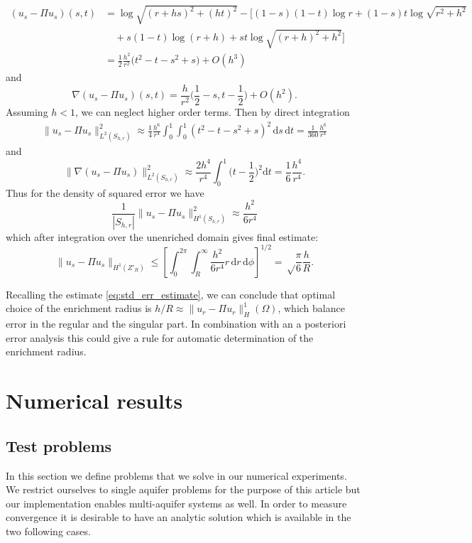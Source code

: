 \documentclass[preprint,12pt]{elsarticle}
\def\abs#1{\left|#1\right|}
\def\d{\mathrm{d}}
\def\norm#1{\| #1 \|}
\def\abs#1{| #1 |}
\begin{document}
\begin{align*}
 (u_s - \Pi u_s)(s,t)&=\log\sqrt{(r+hs)^2+(ht)^2} -\Big[(1-s)(1-t)\log r + (1-s)t\log\sqrt{r^2+h^2}\\
 &\quad+ s(1-t) \log(r+h) + st\log\sqrt{(r+h)^2+h^2} \Big]\\
 &=\frac12 \frac{h^2}{r^2}\big(t^2-t - s^2 +s\big) + O(h^3)
\end{align*}
and 
\begin{equation}
 \nabla(u_s - \Pi u_s)(s,t) = \frac{h}{r^2} \Big( \frac12-s, t-\frac12 \Big) + O(h^2).
\end{equation}
Assuming $h<1$, we can neglect higher order terms. Then by direct integration
\begin{align*}
 \norm{u_s - \Pi u_s}^2_{L^2(S_{h,r})} \approx \frac14 \frac{h^6}{r^4}\int_0^1\int_0^1 (t^2-t-s^2+s)^2\,\d s\, \d t = \frac{1}{360}\frac{h^6}{r^4} 
\end{align*}
and
\begin{equation}
    \label{eq:grad_estimate_on_square}
    \norm{\nabla(u_s - \Pi u_s)}^2_{L^2(S_{h,r})} \approx \frac{2h^4}{r^4} \int_0^1 \Big(t-\frac12\Big)^2 \d t = \frac{1}{6}\frac{h^4}{r^4}.
\end{equation}
Thus for the density of squared error we have
\[
    \frac{1}{\abs{S_{h,r}}} \norm{u_s - \Pi u_s}^2_{H^1(S_{h,r})} \approx \frac{h^2}{6r^4}
\]
which after integration over the unenriched domain gives final estimate:
\begin{equation}
    \label{eq:singular_approx_error}
    \norm{u_s - \Pi u_s}_{H^1(Z'_R)} \le \left[\int_0^{2\pi} \int_R^\infty \frac{h^2} {6r^4} r \,\d r\, \d \phi\right]^{1/2} = \sqrt\frac{\pi}{6}\frac{h}{R}. 
\end{equation}

Recalling the estimate \eqref{eq:std_err_estimate}, we can conclude that optimal choice of the enrichment radius is $h/R\approx \norm{u_r-\Pi u_r}_H^1(\Omega)$, 
which balance error in the regular and the singular part. In combination with an a posteriori error analysis this could give a rule for automatic
determination of the enrichment radius.



\section{Numerical results}
\label{sec:results}

\subsection{Test problems} \label{sec:test_cases}
In this section we define problems that we solve in our numerical experiments. We restrict ourselves to 
single aquifer problems for the purpose of this article but our implementation enables multi-aquifer systems 
as well. In order to measure convergence it is desirable to have an analytic solution which is available
in the two following cases. 
\end{document}
